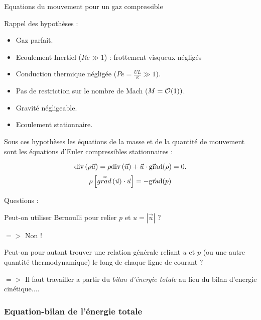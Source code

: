 \begin{frame}{Equations du mouvement pour un gaz compressible}
\small

Rappel des hypothèses :  
\begin{itemize}
\item Gaz parfait.
\item Ecoulement Inertiel ($Re \gg 1$) : frottement visqueux négligés 
\item Conduction thermique négligée ($Pe = \frac{U L}{\kappa} \gg 1$).
\item Pas de restriction sur le nombre de Mach ($M = {\cal O}(1) ) $.
\item Gravité négligeable.
\item Ecoulement stationnaire.  
\end{itemize}

\pause 
\medskip 

Sous ces hypothèses les équations de la masse et de la quantité de mouvement sont 
les équations d'Euler compressibles stationnaires :

$$
\mbox{\rm div}\, ( \rho \vec{u} ) = \rho \mbox{\rm div}\, ( \vec{u} ) + \vec{u} \cdot \vec{\mbox{\rm gra}}\mbox{\rm d} (\rho) = 0.
$$
$$
\rho  \left[ \accentset{\Rightarrow}{grad}\left( \vec{u} \right) \cdot \vec{u}\right]  = - \vec{\mbox{\rm gra}}\mbox{\rm d} (p)
$$

\pause
Questions :
\medskip

\pause

Peut-on utiliser Bernoulli pour relier $p$ et $u = |\vec{u}|$ ? 

\pause 

$=>$ Non ! 
\medskip

\pause
Peut-on pour autant trouver une relation générale reliant $u$ et $p$ (ou une autre quantité thermodynamique) le long de chaque ligne de courant ?

\pause
$=>$ Il faut travailler a partir du {\em bilan d'énergie totale} au lieu du bilan d'energie cinétique....

\end{frame}

\subsubsection{Equation-bilan de l'énergie totale}

